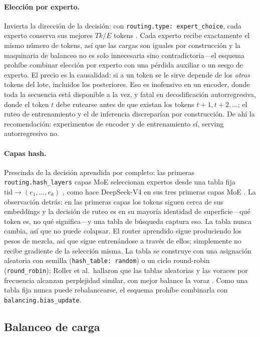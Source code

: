 \paragraph{Elección por experto.}
Invierta la dirección de la decisión: con
\texttt{routing.type: expert\_choice}, cada experto conserva sus mejores
$Tk/E$ tokens \citep{zhou2022expertchoice}. Cada experto recibe exactamente
el mismo número de tokens, así que las cargas son iguales por construcción y
la maquinaria de balanceo no es solo innecesaria sino contradictoria---el
esquema prohíbe combinar elección por experto con una pérdida auxiliar o un
sesgo de experto. El precio es la causalidad: si a un token se le sirve
depende de los \emph{otros} tokens del lote, incluidos los posteriores. Eso
es inofensivo en un encoder, donde toda la secuencia está disponible a la
vez, y fatal en decodificación autorregresiva, donde el token $t$ debe
rutearse antes de que existan los tokens $t{+}1, t{+}2, \dots$; el ruteo de
entrenamiento y el de inferencia discreparían por construcción. De ahí la
recomendación: experimentos de encoder y de entrenamiento sí, serving
autorregresivo no.

\paragraph{Capas hash.}
Prescinda de la decisión aprendida por completo: las primeras
\texttt{routing.hash\_layers} capas MoE seleccionan expertos desde una tabla
fija $\mathrm{tid} \rightarrow (e_1,\dots,e_k)$ \citep{roller2021hash}, como
hace DeepSeek-V4 en sus tres primeras capas MoE \citep{deepseek2026v4}. La
observación detrás: en las primeras capas los tokens siguen cerca de sus
embeddings y la decisión de ruteo es en su mayoría identidad de
superficie---qué token es, no qué significa---y una tabla de búsqueda captura
eso. La tabla nunca cambia, así que no puede colapsar. El router aprendido
sigue produciendo los pesos de mezcla, así que sigue entrenándose a través de
ellos; simplemente no recibe gradiente de la selección misma. La tabla se
construye con una asignación aleatoria con semilla
(\texttt{hash\_table: random}) o un ciclo round-robin (\texttt{round\_robin});
Roller et al.\ hallaron que las tablas aleatorias y las voraces por frecuencia
alcanzan perplejidad similar, con mejor balance la voraz \citep{roller2021hash}.
Como una tabla fija nunca puede rebalancearse, el esquema prohíbe combinarla
con \texttt{balancing.bias\_update}.

\subsection{Balanceo de carga}
\label{app:moe-balancing-es}

